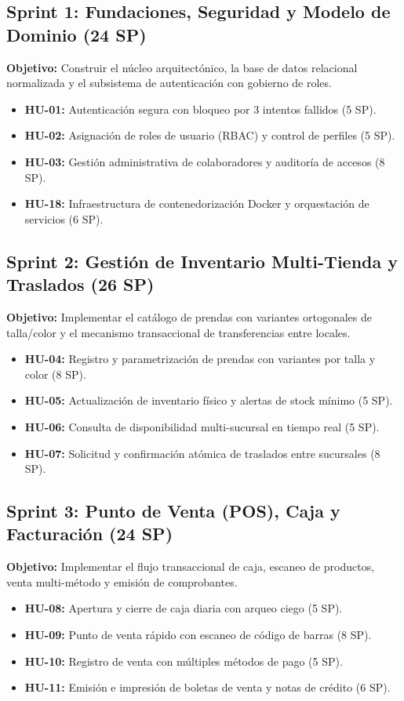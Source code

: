 \subsection{Sprint 1: Fundaciones, Seguridad y Modelo de Dominio (24 SP)}
\textbf{Objetivo:} Construir el núcleo arquitectónico, la base de datos relacional normalizada y el subsistema de autenticación con gobierno de roles.
\begin{itemize}
    \item \textbf{HU-01:} Autenticación segura con bloqueo por 3 intentos fallidos (5 SP).
    \item \textbf{HU-02:} Asignación de roles de usuario (RBAC) y control de perfiles (5 SP).
    \item \textbf{HU-03:} Gestión administrativa de colaboradores y auditoría de accesos (8 SP).
    \item \textbf{HU-18:} Infraestructura de contenedorización Docker y orquestación de servicios (6 SP).
\end{itemize}

\subsection{Sprint 2: Gestión de Inventario Multi-Tienda y Traslados (26 SP)}
\textbf{Objetivo:} Implementar el catálogo de prendas con variantes ortogonales de talla/color y el mecanismo transaccional de transferencias entre locales.
\begin{itemize}
    \item \textbf{HU-04:} Registro y parametrización de prendas con variantes por talla y color (8 SP).
    \item \textbf{HU-05:} Actualización de inventario físico y alertas de stock mínimo (5 SP).
    \item \textbf{HU-06:} Consulta de disponibilidad multi-sucursal en tiempo real (5 SP).
    \item \textbf{HU-07:} Solicitud y confirmación atómica de traslados entre sucursales (8 SP).
\end{itemize}

\subsection{Sprint 3: Punto de Venta (POS), Caja y Facturación (24 SP)}
\textbf{Objetivo:} Implementar el flujo transaccional de caja, escaneo de productos, venta multi-método y emisión de comprobantes.
\begin{itemize}
    \item \textbf{HU-08:} Apertura y cierre de caja diaria con arqueo ciego (5 SP).
    \item \textbf{HU-09:} Punto de venta rápido con escaneo de código de barras (8 SP).
    \item \textbf{HU-10:} Registro de venta con múltiples métodos de pago (5 SP).
    \item \textbf{HU-11:} Emisión e impresión de boletas de venta y notas de crédito (6 SP).
\end{itemize}

